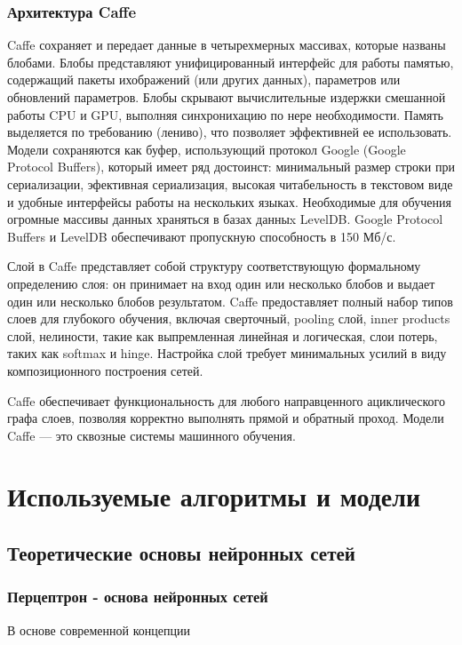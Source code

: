 \documentclass[a4paper,english,russian]{G2-105}
\begin{document}
\subsection{Архитектура Caffe}
\par Caffe сохраняет и передает данные в четырехмерных массивах, которые названы блобами. Блобы представляют унифицированный интерфейс для работы  памятью, содержащий пакеты ихображений (или других данных), параметров или обновлений параметров. Блобы скрывают вычислительные издержки смешанной работы CPU и GPU, выполняя синхронихацию по нере необходимости. Память выделяется по требованию (лениво), что позволяет эффективней ее использовать. Модели сохраняются как буфер, использующий протокол Google (Google Protocol Buffers), который имеет ряд достоинст: минимальный размер строки при сериализации, эфективная сериализация, высокая читабельность в текстовом виде и удобные интерфейсы работы на нескольких языках. Необходимые для обучения огромные массивы данных храняться в базах данныx LevelDB. Google Protocol Buffers и LevelDB обеспечивают пропускную способность в 150 Мб/с. 
\par Слой в Caffe представляет собой структуру соответствующую формальному определению слоя: он принимает на вход один или несколько блобов и выдает один или несколько блобов результатом. Caffe предоставляет полный набор типов слоев для глубокого обучения, включая сверточный, pooling слой, inner products слой, нелиности, такие как выпремленная линейная и логическая, слои потерь, таких как softmax и hinge. Настройка слой требует минимальных усилий в виду композиционного построения сетей.
\par Caffe обеспечивает функциональность для любого направценного ациклического графа слоев, позволяя корректно выполнять прямой и обратный проход. Модели Caffe --- это сквозные системы машинного обучения. 
\chapter{Используемые алгоритмы и модели}
\section{Теоретические основы нейронных сетей}
\subsection{Перцептрон - основа нейронных сетей}
\par В основе современной концепции 
\end{document}
